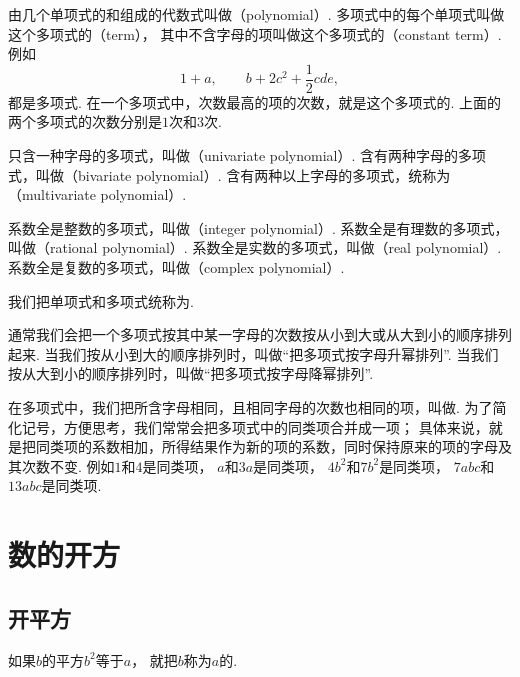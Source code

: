由几个单项式的和组成的代数式叫做（polynomial）.
多项式中的每个单项式叫做这个多项式的（term），
其中不含字母的项叫做这个多项式的（constant term）.
例如\begin{equation*}
	1+a, \qquad
	b+2c^2+\frac12cde,
\end{equation*}都是多项式.
在一个多项式中，次数最高的项的次数，就是这个多项式的.
上面的两个多项式的次数分别是\(1\)次和\(3\)次.

只含一种字母的多项式，叫做（univariate polynomial）.
含有两种字母的多项式，叫做（bivariate polynomial）.
含有两种以上字母的多项式，统称为（multivariate polynomial）.

系数全是整数的多项式，叫做（integer polynomial）.
系数全是有理数的多项式，叫做（rational polynomial）.
系数全是实数的多项式，叫做（real polynomial）.
系数全是复数的多项式，叫做（complex polynomial）.

我们把单项式和多项式统称为.

通常我们会把一个多项式按其中某一字母的次数按从小到大或从大到小的顺序排列起来.
当我们按从小到大的顺序排列时，叫做“把多项式按字母升幂排列”.
当我们按从大到小的顺序排列时，叫做“把多项式按字母降幂排列”.

在多项式中，我们把所含字母相同，且相同字母的次数也相同的项，叫做.
为了简化记号，方便思考，我们常常会把多项式中的同类项合并成一项；
具体来说，就是把同类项的系数相加，所得结果作为新的项的系数，同时保持原来的项的字母及其次数不变.
例如\(1\)和\(4\)是同类项，
\(a\)和\(3a\)是同类项，
\(4b^2\)和\(7b^2\)是同类项，
\(7abc\)和\(13abc\)是同类项.

\section{数的开方}
\subsection{开平方}
如果\(b\)的平方\(b^2\)等于\(a\)，
就把\(b\)称为\(a\)的.

